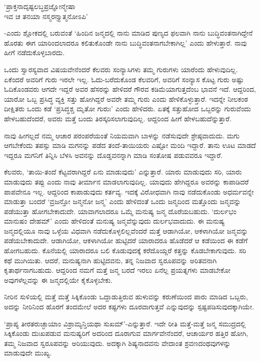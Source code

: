\begin{shloka}
`ಪ್ರಾಕ್ತನಾದೃಷ್ಟಲಬ್ಧಪ್ರಜ್ಞೋನ್ಮೇಷಾ\\
ಇವ ಚ ತನಯಾ ನಸ್ಮರನ್ತ್ಯಾತ್ಮನೋಽಪಿ'
\end{shloka}

-ಎಂದು ಶ್ಲೋಕದಲ್ಲಿ ಬರುವಂತೆ `ಹಿಂದಿನ ಜನ್ಮದಲ್ಲಿ ನಾನು ಮಾಡಿದ ಪುಣ್ಯದ ಫಲವಾಗಿ ನಾನು ಬುದ್ಧಿವಂತನಾಗಿದ್ದೇನೆ ಹೊರತು ಈಗ ಯಾರಿಂದಲಾದರೂ ಕಲಿತುಕೊಂಡೇ ನಾನು ಬುದ್ಧಿವಂತನಾಗಬೇಕಾಗಿಲ್ಲ' ಎಂದು ಹೇಳುತ್ತಾರೆ. ನಾವು ಹೀಗೆ ನಡೆದುಕೊಳ್ಳಬಾರದು.

ಒಂದು ಸ್ವಾರಸ್ಯವಾದ ವಿಷಯವೇನೆಂದರೆ ಕೆಲವರು ಸಂನ್ಯಾಸಿಗಳು ತಮ್ಮ ಗುರುಗಳು ಯಾರೆಂದು ಹೇಳುವುದಿಲ್ಲ. ಏಕೆಂದರೆ ಅವರಿಗೆ ಗುರು ಇರಲೇ ಇಲ್ಲ. ಓದು-ಬರೆದುಕೊಂಡ ಕೆಲವರಿಗೆ, ಅವರಿಗೆ ಸಂನ್ಯಾಸ ಕೊಟ್ಟ ಗುರು ಅಷ್ಟು ಓದಿಕೊಂಡವರು ಆಗದೇ ಇದ್ದರೆ ಅವರ ಹೆಸರನ್ನು ಹೇಳಿದರೆ ಗೌರವ ಕಡಿಮೆಯಾಗುತ್ತದೆಂಬ ಭಾವನೆ ಇದೆ. ಆದ್ದರಿಂದ, ಯಾರೋ ಒಬ್ಬ ಪ್ರಸಿದ್ಧ ವ್ಯಕ್ತಿ ಸತ್ತು ಹೋಗಿದ್ದರೆ ಅವರೇ ತಮ್ಮ ಗುರು ಎಂದು ಹೇಳಿಕೊಳ್ಳುತ್ತಾರೆ. ಇದನ್ನೇ ನೀಲಕಂಠ ದೀಕ್ಷಿತರು ಒಂದು ಕಡೆ `ಪ್ರಸಿದ್ಧಶ್ಚ ಮೃತೋ ಗುರುಃ' ಎಂದು ಹೇಳಿದರು. ಏತಕ್ಕೆ ಸತ್ತುಹೋದ ಒಬ್ಬರನ್ನು ಗುರುವೆಂದು ಹೇಳಬಹುದೆಂದರೆ, ಅವರು ಮತ್ತೆ ಬಂದು ತಿರಸ್ಕರಿಸಲಾಗುವುದಿಲ್ಲ. ಆದ್ದರಿಂದ ಹೀಗೆ ಹೇಳಬಹುದೆನ್ನುತ್ತಾರೆ.

ನಾವು ಹೀಗಲ್ಲದೆ ನಮ್ಮ ಆಚಾರ ಪರಂಪರೆಯಂತೆ ನಿಯಮವಾಗಿ ಬಾಳನ್ನು ನಡೆಸುವುದೇ ಶ್ರೇಷ್ಠವಾದುದು. ಮಗು ಆಗಬೇಕೆಂದು ತಪಸ್ಸು ಮಾಡಿ ಮಗನನ್ನು ಪಡೆದ ತಂದೆ-ತಾಯಿಯರು ಎಷ್ಟೋ ಮಂದಿ ಇದ್ದಾರೆ. ತಾನು ಊಟ ಮಾಡದೆ ಇದ್ದರೂ ಮಗನಿಗೆ ತಿನ್ನಿಸಿ ಬೆಳಸಿ ಅವನನ್ನು ದೊಡ್ಡವನನ್ನಾಗಿ ಮಾಡಿ ಸಂತೋಷ ಪಡುವವರೂ ಇದ್ದಾರೆ.

ಕೆಲವರು, `ತಾಯಿ-ತಂದೆ ಕೆಟ್ಟವರಾಗಿದ್ದರೆ ಏನು ಮಾಡುವುದು' ಎನ್ನುತ್ತಾರೆ. ಯಾರು ಮಾಡುವುದು ಸರಿ, ಯಾರು ಮಾಡುವುದು ತಪ್ಪು ಎಂದು ನಾವು ತೀರ್ಮಾನ ಮಾಡಲಾಗುವುದಿಲ್ಲ. ಯಾವುದು ಹೇಗಿದ್ದರೂ ಅವರನ್ನು ಕಾಪಾಡಿದರೆ ಪಾಪವೇನೂ ಇಲ್ಲ. ಆದ್ದರಿಂದ ಕಾಪಾಡುವುದು ಕರ್ತವ್ಯ. ಇದಕ್ಕೆ ವಿರೋಧವಾಗಿ ನಾವು ನಡೆದುಕೊಂಡು ಅಧರ್ಮವನ್ನೇ ಮಾಡುತ್ತಾ ಬಂದರೆ `ವ್ರಜನ್ತೋ ಜನ್ಮನೋ ಜನ್ಮ' ಎಂದು ಹೇಳಿದಂತೆ ಒಂದು ಜನ್ಮದಿಂದ ಮತ್ತೊಂದು ಜನ್ಮವನ್ನು ಪಡೆಯುತ್ತಾ ಹೋಗಬೇಕಾದುದೇ. ಯಾವಾಗಲಾದರೂ ಒಮ್ಮೆ ಮನುಷ್ಯ ಜನ್ಮ ದೊರೆಯಬಹುದು. `ದುರ್ಲಭಂ ಮಾನುಷಂ ದೇಹಮ್' ಎಂದು ಹೇಳಿದಂತೆ ಮನುಷ್ಯ ಜನ್ಮವೆನ್ನುವುದು ದುರ್ಲಭವಾದುದು. ಈ ಮನುಷ್ಯ ಜನ್ಮದಲ್ಲಿಯೂ ನಾವು ಒಳ್ಳೆಯ ವಿಧವಾಗಿ ನಡೆದುಕೊಳ್ಳಲಿಲ್ಲವೆಂದರೆ ಮತ್ತೆ ಆಡಾಗಿಯೋ, ಆಕಳಾಗಿಯೋ ಜನ್ಮವನ್ನು ಪಡೆಯಬೇಕಾದುದೇ. ಆಡಾಗಿಯೋ, ಆಕಳಾಗಿಯೋ ಹುಟ್ಟಿದರೆ ಯಾರಾದರೂ ಹೊಡೆದರೆ ಆ ಕಡೆಯಿಂದ ಈ ಕಡೆಗೆ ಹೋಗಬಹುದು. ಕೊನೆಯಲ್ಲಿ ಯಾರಾದರೂ ಬಲಿ ಕೊಡುವುದಕ್ಕೆ ಕರೆದೊಯ್ದರೆ ಕತ್ತನ್ನು ಕೊಡಬೇಕಾಗುವುದು. ಸರಿ ಕಥೆ ಮುಗಿಯಿತು. ಆದರೆ, ಮನುಷ್ಯನಾಗಿ ಹುಟ್ಟಿದವನು, ತನ್ನ ನಿಜವಾದ ಸ್ವರೂಪವನ್ನು ಅರಿತವನಾಗಿ ಕೃತಾರ್ಥನಾಗಬಹುದು. ಆದ್ದರಿಂದ ನಮಗೆ ಮತ್ತೆ ಜನ್ಮ ಬರದೆ ಇರಲು ಏನೆಲ್ಲ ಪ್ರಯತ್ನಗಳು ಮಾಡಬೇಕೋ ಅವುಗಳೆಲ್ಲವನ್ನು ಈ ಜನ್ಮದಲ್ಲಿಯೇ ಕೈಕೊಳ್ಳಬೇಕು.

ನೀರಿನ ಸುಳಿಯಲ್ಲಿ ಮತ್ತೆ ಮತ್ತೆ ಸಿಕ್ಕಿಕೊಂಡು ಒದ್ದಾಡುತ್ತಿರುವ ಹುಳುವನ್ನು ಕರುಣೆಯಿಂದ ಪಾರು ಮಾಡಿದ ಒಬ್ಬರು, ಅದನ್ನು ನೀರಿನಿಂದ ಹೊರಗೆ ತಂದಮೇಲೆ ಅದರ ಕಷ್ಟಗಳು ದೂರವಾಗುತ್ತವೆ ಎನ್ನುವುದನ್ನು ಸ್ಪಷ್ಟಪಡಿಸುವುದಕ್ಕಾಗಿಯೇ.

`ಪ್ರಾಪ್ಯ ತೀರತರುಚ್ಛಾಯಾಂ ವಿಶ್ರಾಮ್ಯನ್ತಿಯಥಾ ಸುಖಮ್'-ಎನ್ನುತ್ತಾರೆ. ಇದೇ ರೀತಿ ಮತ್ತೆ-ಮತ್ತೆ ಜನ್ಮ ಸಮುದ್ರದಲ್ಲಿ ಸಿಕ್ಕಿಕೊಂಡು ದುಃಖಪಡುವ ಮನುಷ್ಯರಿಗೆ ಅದರಿಂದ ದೂರಾಗುವ ಮಾರ್ಗವೇನೆಂದರೆ, ಆಚಾರ್ಯರ ಹತ್ತಿರ ಹೋಗಿ, ತಮ್ಮ ನಿಜವಾದ ಸ್ವರೂಪವನ್ನು ಅರಿಯುವುದು. ಅದಕ್ಕಾಗಿ ಶಿಷ್ಯನಾದವನು ವೇದಾಂತ ಶ್ರವಣದಂಥವುಗಳನ್ನು ಮಾಡುವುದೇ ಮುಖ್ಯ.

